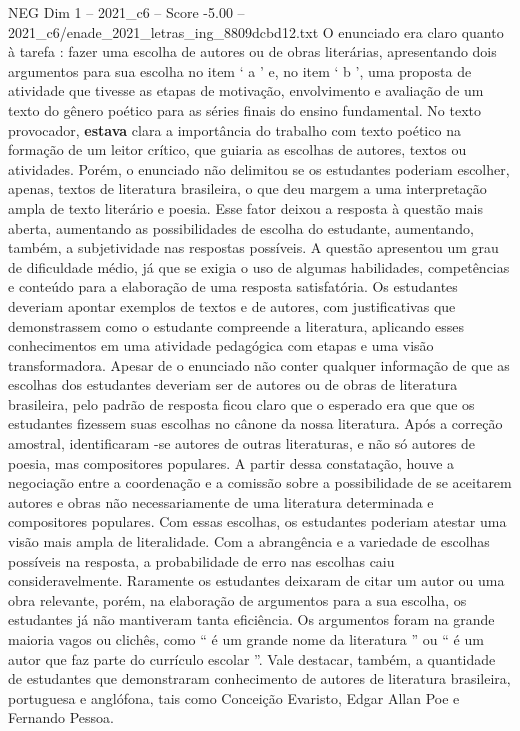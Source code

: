 \begin{textsample}{NEG Dim 1 – 2021\_c6 – Score -5.00 – 2021\_c6/enade\_2021\_letras\_ing\_8809dcbd12.txt}
O enunciado era claro quanto à tarefa : fazer uma escolha de autores ou de obras literárias, apresentando dois argumentos para sua escolha no item ‘ a ’ e, no item ‘ b ’, uma proposta de atividade que tivesse as etapas de motivação, envolvimento e avaliação de um texto do gênero poético para as séries finais do ensino fundamental.
No texto provocador, \textbf{estava} clara a importância do trabalho com texto poético na formação de um leitor crítico, que guiaria as escolhas de autores, textos ou atividades.
Porém, o enunciado não delimitou se os estudantes poderiam escolher, apenas, textos de literatura brasileira, o que deu margem a uma interpretação ampla de texto literário e poesia.
Esse fator deixou a resposta à questão mais aberta, aumentando as possibilidades de escolha do estudante, aumentando, também, a subjetividade nas respostas possíveis.
A questão apresentou um grau de dificuldade médio, já que se exigia o uso de algumas habilidades, competências e conteúdo para a elaboração de uma resposta satisfatória.
Os estudantes deveriam apontar exemplos de textos e de autores, com justificativas que demonstrassem como o estudante compreende a literatura, aplicando esses conhecimentos em uma atividade pedagógica com etapas e uma visão transformadora.
Apesar de o enunciado não conter qualquer informação de que as escolhas dos estudantes deveriam ser de autores ou de obras de literatura brasileira, pelo padrão de resposta ficou claro que o esperado era que que os estudantes fizessem suas escolhas no cânone da nossa literatura.
Após a correção amostral, identificaram -se autores de outras literaturas, e não só autores de poesia, mas compositores populares.
A partir dessa constatação, houve a negociação entre a coordenação e a comissão sobre a possibilidade de se aceitarem autores e obras não necessariamente de uma literatura determinada e compositores populares.
Com essas escolhas, os estudantes poderiam atestar uma visão mais ampla de literalidade.
Com a abrangência e a variedade de escolhas possíveis na resposta, a probabilidade de erro nas escolhas caiu consideravelmente.
Raramente os estudantes deixaram de citar um autor ou uma obra relevante, porém, na elaboração de argumentos para a sua escolha, os estudantes já não mantiveram tanta eficiência.
Os argumentos foram na grande maioria vagos ou clichês, como “ é um grande nome da literatura ” ou “ é um autor que faz parte do currículo escolar ”.
Vale destacar, também, a quantidade de estudantes que demonstraram conhecimento de autores de literatura brasileira, portuguesa e anglófona, tais como Conceição Evaristo, Edgar Allan Poe e Fernando Pessoa.

\end{textsample}
